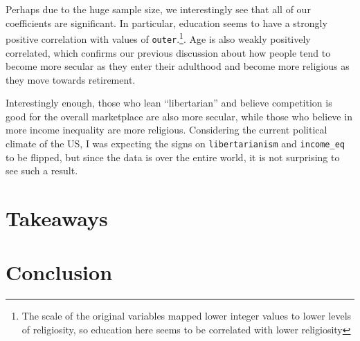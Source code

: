 \documentclass{article}
\begin{document}
	Perhaps due to the huge sample size, we interestingly see that all of our coefficients are significant. In particular, education seems to have a strongly positive correlation with values of \texttt{outer}.\footnote{The scale of the original variables mapped lower integer values to lower levels of religiosity, so education here seems to be correlated with lower religiosity}. Age is also weakly positively correlated, which confirms our previous discussion about how people tend to become more secular as they enter their adulthood and become more religious as they move towards retirement.
	
	Interestingly enough, those who lean ``libertarian'' and believe competition is good for the overall marketplace are also more secular, while those who believe in more income inequality are more religious. Considering the current political climate of the US, I was expecting the signs on \texttt{libertarianism} and \texttt{income\_eq} to be flipped, but since the data is over the entire world, it is not surprising to see such a result.
	
	\section{Takeaways}
	
	\section{Conclusion}
	
	\newpage
	\nocite{*}
	
\end{document}
